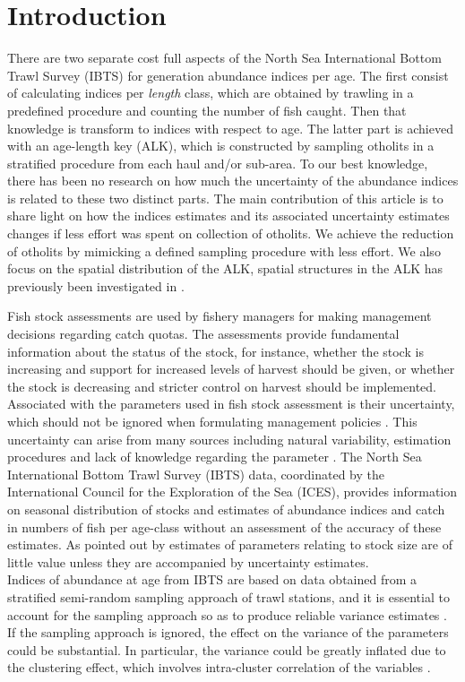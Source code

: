 \documentclass[a4paper 12pt]{article}
\numberwithin{equation}{section}
\begin{document}
\section{Introduction}
There are two separate cost full aspects of the North Sea International Bottom Trawl Survey (IBTS) for generation abundance indices per age.  The first consist of calculating indices per \textit{length} class, which are obtained by trawling in a predefined procedure and counting the number of fish caught. Then that knowledge is transform to indices with respect to age. The latter part is achieved with an age-length key (ALK), which is constructed by sampling otholits in a stratified procedure from each haul and/or sub-area. To our best knowledge, there has been no research on how much the uncertainty of the abundance indices is related to these two distinct parts. The main contribution of this article is to share light on how the indices estimates and its associated uncertainty estimates changes if less effort was spent on collection of otholits. We achieve the reduction of otholits by mimicking a defined sampling procedure with less effort. We also focus on the spatial distribution of the ALK, spatial structures in the ALK has previously been investigated in \citet{berg2012spatial, hirst2012bayesian}.

Fish stock assessments are used by fishery managers for making management decisions regarding catch quotas. The assessments provide fundamental information about the status of the stock, for instance, whether the stock is increasing and support for increased levels of harvest should be given, or whether the stock is decreasing and stricter control on harvest should be implemented. Associated with the parameters used in fish stock assessment is their uncertainty, which should not be ignored when formulating management policies \citep{walters1981effects, ludwig1981measurement}. This uncertainty can arise from many sources including natural variability, estimation procedures and lack of knowledge regarding the parameter \citep{ehrhardt1997role}. The North Sea International Bottom Trawl Survey (IBTS) data, coordinated by the International Council for the Exploration of the Sea (ICES), provides information on seasonal distribution of stocks and estimates of abundance indices and catch in numbers of fish per age-class without an assessment of the accuracy of these estimates.  As pointed out by  \citet{ludwig1981measurement} estimates of parameters relating to stock size are of little value unless they are accompanied by uncertainty estimates. \\
\indent Indices of abundance at age from IBTS  are based on data obtained from a stratified semi-random sampling approach of trawl stations,  and  it is essential to account for the sampling approach so as to produce reliable variance estimates \citep{lehtonen2004practical}. If the sampling approach is ignored, the effect on the variance  of the parameters could be substantial.  In particular, the variance could be greatly inflated  due to the clustering effect, which involves intra-cluster correlation of the variables \citep{aanes2015efficient, lehtonen2004practical}. 
\end{document}
